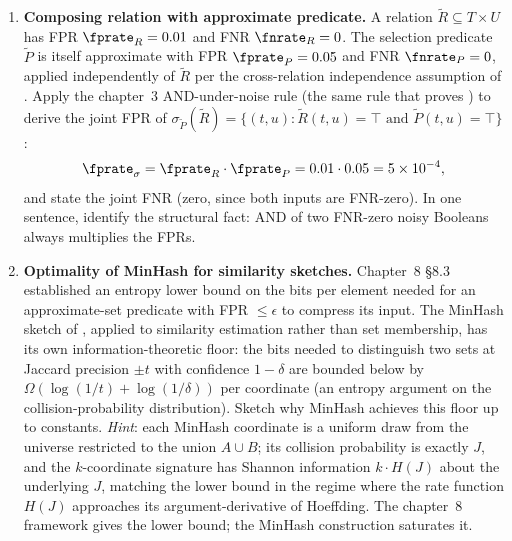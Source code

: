 \begin{enumerate}
\item \exstarstar
\label{ex:ch12-8}
\textbf{Composing relation with approximate predicate.}
A relation $\tilde R \subseteq T \times U$ has FPR $\fprate_R =
0.01$ and FNR $\fnrate_R = 0$. The selection predicate $\tilde P$
is itself approximate with FPR $\fprate_P = 0.05$ and FNR
$\fnrate_P = 0$, applied independently of $\tilde R$ per the
cross-relation independence assumption of .
Apply the chapter~3 AND-under-noise rule (the same rule that
proves ) to derive the joint FPR of
$\sigma_{\tilde P}(\tilde R) = \{(t, u) : \tilde R(t, u) = \top
\text{ and } \tilde P(t, u) = \top\}$:
\[
  \fprate_\sigma = \fprate_R \cdot \fprate_P = 0.01 \cdot 0.05 = 5
    \times 10^{-4},
\]
and state the joint FNR (zero, since both inputs are FNR-zero).
In one sentence, identify the structural fact: AND of two FNR-zero
noisy Booleans always multiplies the FPRs.


\item \exstarstarstar
\label{ex:ch12-9}
\textbf{Optimality of MinHash for similarity sketches.}
Chapter~8 \S8.3 established an entropy lower bound on the bits per
element needed for an approximate-set predicate with FPR $\le
\epsilon$ to compress its input. The MinHash sketch of
, applied to similarity estimation rather than
set membership, has its own information-theoretic floor: the bits
needed to distinguish two sets at Jaccard precision $\pm t$ with
confidence $1 - \delta$ are bounded below by $\Omega(\log(1/t) +
\log(1/\delta))$ per coordinate (an entropy argument on the
collision-probability distribution). Sketch why MinHash achieves
this floor up to constants. \emph{Hint}: each MinHash coordinate
is a uniform draw from the universe restricted to the union $A
\cup B$; its collision probability is exactly $J$, and the
$k$-coordinate signature has Shannon information $k \cdot H(J)$
about the underlying $J$, matching the lower bound in the regime
where the rate function $H(J)$ approaches its argument-derivative
of Hoeffding. The chapter~8 framework gives the lower bound; the
MinHash construction saturates it.


\end{enumerate}
